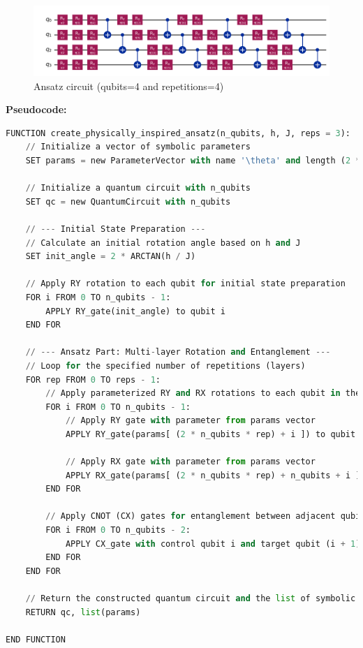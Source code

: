 \documentclass[pre,twocolumn,floatfix]{revtex4-1}
\begin{document}
\begin{figure}[htbp]
    \centering
    \includegraphics[width=0.5\linewidth]{images/ansatz.png}
    \caption{Ansatz circuit (qubits=4 and repetitions=4)}
    \label{4}
\end{figure}

\textbf{Pseudocode:}
\begin{lstlisting}[language=Python]
    FUNCTION create_physically_inspired_ansatz(n_qubits, h, J, reps = 3):
    // Initialize a vector of symbolic parameters
    SET params = new ParameterVector with name '\theta' and length (2 * n_qubits * reps)

    // Initialize a quantum circuit with n_qubits
    SET qc = new QuantumCircuit with n_qubits

    // --- Initial State Preparation ---
    // Calculate an initial rotation angle based on h and J
    SET init_angle = 2 * ARCTAN(h / J)

    // Apply RY rotation to each qubit for initial state preparation
    FOR i FROM 0 TO n_qubits - 1:
        APPLY RY_gate(init_angle) to qubit i
    END FOR

    // --- Ansatz Part: Multi-layer Rotation and Entanglement ---
    // Loop for the specified number of repetitions (layers)
    FOR rep FROM 0 TO reps - 1:
        // Apply parameterized RY and RX rotations to each qubit in the current layer
        FOR i FROM 0 TO n_qubits - 1:
            // Apply RY gate with parameter from params vector
            APPLY RY_gate(params[ (2 * n_qubits * rep) + i ]) to qubit i

            // Apply RX gate with parameter from params vector
            APPLY RX_gate(params[ (2 * n_qubits * rep) + n_qubits + i ]) to qubit i
        END FOR

        // Apply CNOT (CX) gates for entanglement between adjacent qubits
        FOR i FROM 0 TO n_qubits - 2:
            APPLY CX_gate with control qubit i and target qubit (i + 1)
        END FOR
    END FOR

    // Return the constructed quantum circuit and the list of symbolic parameters
    RETURN qc, list(params)

END FUNCTION
\end{lstlisting}
\end{document}
